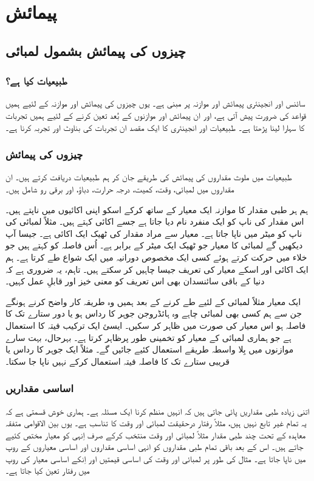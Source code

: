 \chapter{پیمائش}
	\section{چیزوں کی پیمائش بشمول لمبائی}
	\subsection{طبیعیات کیا ہے؟}
	سائنس اور انجینئری پیمائش اور موازنہ پر مبنی ہے۔ یوں چیزوں کی پیمائش اور موازنہ کے لئیے ہمیں قواعد کی ضرورت پیش آتی ہے، اور ان پیمائش اور موازنوں کے بُعد تعین کرنے کے لئیے ہمیں تجربات کا سہارا لینا پڑھتا ہے۔ طبیعیات اور انجینئری کا ایک مقصد ان تجربات کی بناوٹ اور تجربہ کرنا ہے۔
	\subsection{چیزوں کی پیمائش}
	طبیعیات میں ملوث مقداروں کی پیمائش کی طریقے جان کر ہم طبیعیات دریافت کرتے ہیں۔ ان مقداروں میں لمبائی، وقت، کمیت، درجہ حرارت، دباؤ، اور برقی رو شامل ہیں۔
	
	ہم ہر طبی مقدار کا موازنہ ایک معیار کے ساتھ کرکے اسکو اپنی اکائیوں میں ناپتے ہیں۔ اس مقدار کی ناپ کو ایک منفرد نام دیا جاتا ہے جسے اکائی کہتے ہیں۔ مثلاً لمبائی کی ناپ کو میٹر میں ناپا جاتا ہے۔ معیار سے مراد مقدار کی ٹھیک ایک اکائی ہے۔ جیسا آپ دیکھیں گے لمبائی کا معیار جو ٹھیک ایک میٹر کے برابر ہے۔ اُس فاصلہ کو کہتے ہیں جو خلاء میں حرکت کرتے ہوئے کسی ایک مخصوص دورانیہ میں ایک شواع طے کرتا ہے۔ ہم ایک اکائی اور اسکے معیار کی تعریف جیسا چاہیں کر سکتے ہیں۔ تاہم، یہ ضروری ہے کہ دنیا کے باقی سائنسدان بھی اس تعریف کو معنی خیز اور قابلِ عمل کہیں۔
	
	ایک معیار مثلاً لمبائی کے لئیے طے کرنے کے بعد ہمیں وہ طریقہ کار واضح کرنے ہونگے جن سے ہم کسی بھی لمبائی چاہے وہ ہائڈروجن جوہر کا رداس ہو یا دور ستارے تک کا فاصلہ ہو اس معیار کی صورت میں ظاہر کر سکیں۔ ایسئ ایک ترکیب فیتہ کا استعمال ہے جو ہماری لمبائی کے معیار کو تخمینی طور پرظاہر کرتا ہے۔ بہرحال، بہت سارے موازنوں میں بِلا واسطہ طریقے استعمال کئیے جائیں گے۔ مثلاً ایک جوہر کا رداس یا قریبی ستارے تک کا فاصلہ فیتہ استعمال کرکے نہیں ناپا جا سکتا۔
	\subsection{اساسی مقداریں}
	اتنی زیادہ طبی مقداریں پائی جاتی ہیں کہ انہیں منظم کرنا ایک مسئلہ ہے۔ ہماری خوش قسمتی ہے کہ یہ تمام غیر تابع نہیں ہیں، مثلاً رفتار درحقیقت لمبائی اور وقت کا تناسب ہے۔ یوں بین الاقوامی متفقہ معاہدہ کے تحت چند طبی مقدار مثلاً لمبائی اور وقت منتخب کرکے صرف اِنہی کو معیار مختص کئیے جاتے ہیں۔ اس کے بعد باقی تمام طبی مقداروں کو انہی اساسی مقداروں اور اساسی معیاروں کے روپ میں ناپا جاتا ہے۔ مثال کی طور پر لمبائی اور وقت کی اساسی قیمتیں اور اِنکے اساسی معیار کی روپ میں رفتار تعین کیا جاتا ہے۔
	
